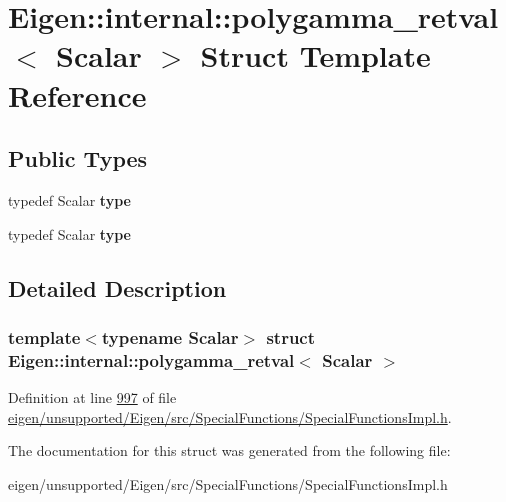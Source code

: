 \hypertarget{struct_eigen_1_1internal_1_1polygamma__retval}{}\section{Eigen\+:\+:internal\+:\+:polygamma\+\_\+retval$<$ Scalar $>$ Struct Template Reference}
\label{struct_eigen_1_1internal_1_1polygamma__retval}
\subsection*{Public Types}
\begin{DoxyCompactItemize}
\item 
\mbox{\label{struct_eigen_1_1internal_1_1polygamma__retval_af9fe8167179603a2b8fc95fbbcff4dff}} 
typedef Scalar {\bfseries type}
\item 
\mbox{\label{struct_eigen_1_1internal_1_1polygamma__retval_af9fe8167179603a2b8fc95fbbcff4dff}} 
typedef Scalar {\bfseries type}
\end{DoxyCompactItemize}


\subsection{Detailed Description}
\subsubsection*{template$<$typename Scalar$>$\newline
struct Eigen\+::internal\+::polygamma\+\_\+retval$<$ Scalar $>$}



Definition at line \hyperlink{eigen_2unsupported_2_eigen_2src_2_special_functions_2_special_functions_impl_8h_source_l00997}{997} of file \hyperlink{eigen_2unsupported_2_eigen_2src_2_special_functions_2_special_functions_impl_8h_source}{eigen/unsupported/\+Eigen/src/\+Special\+Functions/\+Special\+Functions\+Impl.\+h}.



The documentation for this struct was generated from the following file\+:\begin{DoxyCompactItemize}
\item 
eigen/unsupported/\+Eigen/src/\+Special\+Functions/\+Special\+Functions\+Impl.\+h\end{DoxyCompactItemize}
